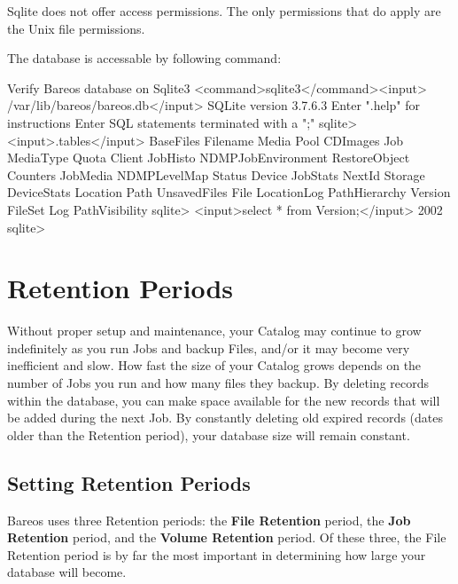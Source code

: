 Sqlite does not offer access permissions. The only permissions that do apply are the Unix file permissions.

The database is accessable by following command:
\begin{commands}{Verify Bareos database on Sqlite3}
<command>sqlite3</command><input> /var/lib/bareos/bareos.db</input>
SQLite version 3.7.6.3
Enter ".help" for instructions
Enter SQL statements terminated with a ";"
sqlite> <input>.tables</input>
BaseFiles           Filename            Media               Pool
CDImages            Job                 MediaType           Quota
Client              JobHisto            NDMPJobEnvironment  RestoreObject
Counters            JobMedia            NDMPLevelMap        Status
Device              JobStats            NextId              Storage
DeviceStats         Location            Path                UnsavedFiles
File                LocationLog         PathHierarchy       Version
FileSet             Log                 PathVisibility
sqlite> <input>select * from Version;</input>
2002
sqlite>
\end{commands}




\section{Retention Periods}

Without proper setup and maintenance, your Catalog may continue to grow
indefinitely as you run Jobs and backup Files, and/or it may become
very inefficient and slow. How fast the size of your
Catalog grows depends on the number of Jobs you run and how many files they
backup. By deleting records within the database, you can make space available
for the new records that will be added during the next Job. By constantly
deleting old expired records (dates older than the Retention period), your
database size will remain constant.


\subsection*{Setting Retention Periods}
\label{Retention}

Bareos uses three Retention periods: the {\bf File Retention} period,
the {\bf Job Retention} period, and the {\bf Volume Retention} period. Of
these three, the File Retention period is by far the most important in
determining how large your database will become.

